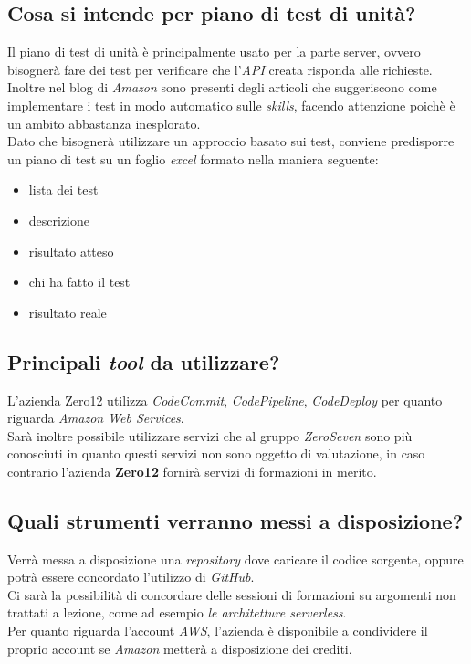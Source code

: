 \documentclass[a4paper,12pt]{article}
\begin{document}
	\subsection{Cosa si intende per piano di test di unità?}
	Il piano di test di unità è principalmente usato per la parte server, ovvero bisognerà fare dei test per verificare che l'\textit{API} creata risponda alle richieste. \\
	Inoltre nel blog di \textit{Amazon} sono presenti degli articoli che suggeriscono come implementare i test in modo  automatico sulle \textit{skills}, facendo attenzione poichè è un ambito abbastanza inesplorato. \\
	Dato che bisognerà utilizzare un approccio basato sui test, conviene predisporre un piano di test su un foglio \textit{excel} formato nella maniera seguente:
	\begin{itemize}
		\item lista dei test
		\item descrizione
		\item risultato atteso
		\item chi ha fatto il test
		\item risultato reale
	\end{itemize}
	
	\subsection{Principali \textit{tool} da utilizzare?}
	L'azienda Zero12 utilizza \textit{CodeCommit}, \textit{CodePipeline}, \textit{CodeDeploy} per quanto riguarda \textit{Amazon Web Services}. \\
	Sarà inoltre possibile utilizzare servizi che al gruppo \textit{ZeroSeven} sono più conosciuti in quanto questi servizi non sono oggetto di valutazione, in caso contrario l'azienda \textbf{Zero12} fornirà servizi di formazioni in merito.
	
	\subsection{Quali strumenti verranno messi a disposizione?}
	Verrà messa a disposizione una \textit{repository} dove caricare il codice sorgente, oppure potrà essere concordato l'utilizzo di \textit{GitHub}. \\
	Ci sarà la possibilità di concordare delle sessioni di formazioni su argomenti non trattati a lezione, come ad esempio \textit{le architetture serverless}. \\
	Per quanto riguarda l'account \textit{AWS}, l'azienda è disponibile a condividere il proprio account se \textit{Amazon} metterà a disposizione dei crediti.	
	\label{LastPage}
\end{document}
